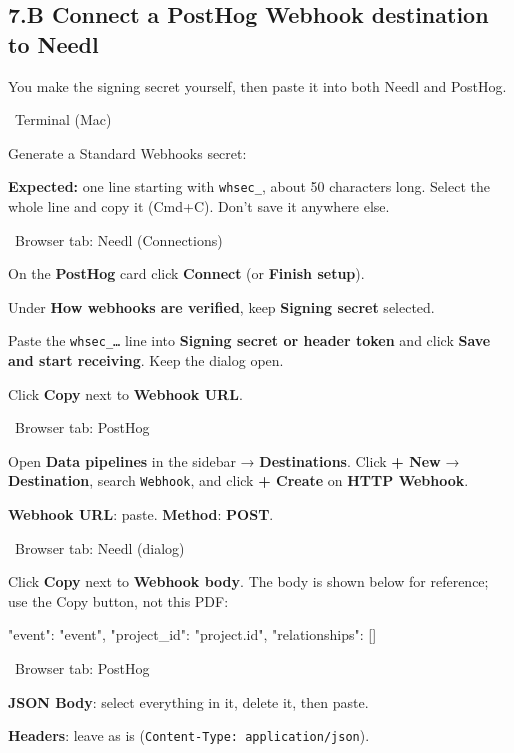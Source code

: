 \documentclass[11pt,a4paper]{article}
\newcommand{\ui}[1]{\textbf{#1}}
\newcommand{\where}[1]{\par\smallskip\noindent\colorbox{winbg}{\color{winfg}\bfseries\strut\ #1\ }\par\nopagebreak[4]}
\newcommand{\lit}[1]{\texttt{#1}}
\begin{document}
\subsection*{7.B Connect a PostHog Webhook destination to Needl}
You make the signing secret yourself, then paste it into both Needl and PostHog.
\where{Terminal (Mac)}
\begin{steps}
\item Generate a Standard Webhooks secret:
\textbf{Expected:} one line starting with \lit{whsec\_}, about 50 characters long. Select the whole line and copy it (Cmd+C). Don't save it anywhere else.
\end{steps}
\where{Browser tab: Needl (Connections)}
\begin{steps}[resume]
\item On the \ui{PostHog} card click \ui{Connect} (or \ui{Finish setup}).
\item Under \ui{How webhooks are verified}, keep \ui{Signing secret} selected.
\item Paste the \lit{whsec\_…} line into \ui{Signing secret or header token} and click \ui{Save and start receiving}. Keep the dialog open.
\item Click \ui{Copy} next to \ui{Webhook URL}.
\end{steps}
\where{Browser tab: PostHog}
\begin{steps}[resume]
\item Open \ui{Data pipelines} in the sidebar → \ui{Destinations}. Click \ui{+ New} → \ui{Destination}, search \lit{Webhook}, and click \ui{+ Create} on \ui{HTTP Webhook}.
\item \ui{Webhook URL}: paste. \ui{Method}: \ui{POST}.
\end{steps}
\where{Browser tab: Needl (dialog)}
\begin{steps}[resume]
\item Click \ui{Copy} next to \ui{Webhook body}. The body is shown below for reference; use the Copy button, not this PDF:
\begin{cmd}
{
  "event": "{event}",
  "project_id": "{project.id}",
  "relationships": []
}
\end{cmd}
\end{steps}
\where{Browser tab: PostHog}
\begin{steps}[resume]
\item \ui{JSON Body}: select everything in it, delete it, then paste.
\item \ui{Headers}: leave as is (\lit{Content-Type: application/json}).
\end{steps}
\end{document}
